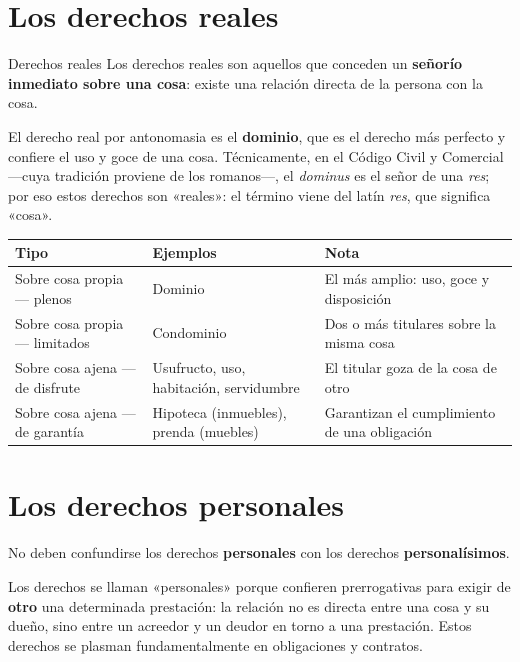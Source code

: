 \documentclass[12pt,oneside]{book}
\newenvironment{tabla}{%
    \par\medskip\begingroup\small\renewcommand{\arraystretch}{1.3}\noindent\ignorespaces
}{%
    \par\endgroup\medskip
}
\begin{document}
\section{Los derechos reales}

\begin{definition}{Derechos reales}
Los derechos reales son aquellos que conceden un \textbf{señorío inmediato sobre una cosa}: existe una relación directa de la persona con la cosa.
\end{definition}

El derecho real por antonomasia es el \textbf{dominio}, que es el derecho más perfecto y confiere el uso y goce de una cosa. Técnicamente, en el Código Civil y Comercial ---cuya tradición proviene de los romanos---, el \textit{dominus} es el señor de una \textit{res}; por eso estos derechos son «reales»: el término viene del latín \textit{res}, que significa «cosa».

\begin{tabla}
\begin{tabularx}{\textwidth}{B{4.4cm}P{4.2cm}Y}
\toprule
Tipo & \textbf{Ejemplos} & \textbf{Nota} \\
\midrule
Sobre cosa propia --- plenos & Dominio & El más amplio: uso, goce y disposición \\
Sobre cosa propia --- limitados & Condominio & Dos o más titulares sobre la misma cosa \\
Sobre cosa ajena --- de disfrute & Usufructo, uso, habitación, servidumbre & El titular goza de la cosa de otro \\
Sobre cosa ajena --- de garantía & Hipoteca (inmuebles), prenda (muebles) & Garantizan el cumplimiento de una obligación \\
\bottomrule
\end{tabularx}
\end{tabla}

\section{Los derechos personales}

\begin{important}
No deben confundirse los derechos \textbf{personales} con los derechos \textbf{personalísimos}.
\end{important}

Los derechos se llaman «personales» porque confieren prerrogativas para exigir de \textbf{otro} una determinada prestación: la relación no es directa entre una cosa y su dueño, sino entre un acreedor y un deudor en torno a una prestación. Estos derechos se plasman fundamentalmente en obligaciones y contratos.
\end{document}
